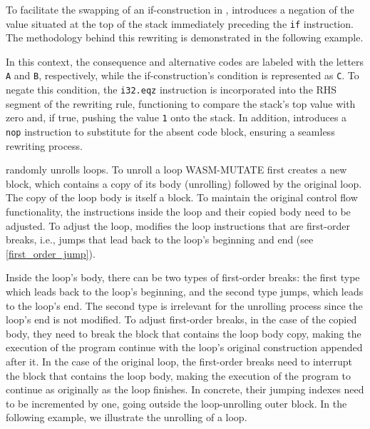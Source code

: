To facilitate the swapping of an if-construction in \Wasm, \tool introduces a negation of the value situated at the top of the stack immediately preceding the \texttt{if} instruction. 
The methodology behind this rewriting is demonstrated in the following example.




In this context, the consequence and alternative codes are labeled with the letters \texttt{A} and \texttt{B}, respectively, while the if-construction's condition is represented as \texttt{C}. 
To negate this condition, the \texttt{i32.eqz} instruction is incorporated into the RHS segment of the rewriting rule, functioning to compare the stack's top value with zero and, if true, pushing the value \texttt{1} onto the stack.
In addition, \tool introduces a \texttt{nop} instruction to substitute for the absent code block, ensuring a seamless rewriting process.


 \tool randomly unrolls loops.
To unroll a loop WASM-MUTATE first creates a new \wasm block, which contains a copy of its body (unrolling) followed by the original loop.
The copy of the loop body is itself a \wasm block.
To maintain the original control flow functionality, the instructions inside the loop and their copied body need to be adjusted.
To adjust the loop, \tool modifies the loop instructions that are first-order breaks, i.e., jumps that lead back to the loop's beginning and end (see \autoref{first_order_jump}). 

Inside the loop's body, there can be two types of first-order breaks: the first type which leads back to the loop's beginning, and the second type jumps, which leads to the loop's end.
The second type is irrelevant for the unrolling process since the loop's end is not modified.
To adjust first-order breaks, in the case of the copied body, they need to break the \wasm block that contains the loop body copy, making the execution of the program continue with the loop's original construction appended after it.
In the case of the original loop, the first-order breaks need to interrupt the block that contains the loop body, making the execution of the program to continue as originally as the loop finishes.
In concrete, their jumping indexes need to be incremented by one, going outside the loop-unrolling outer \wasm block.
In the following example, we illustrate the unrolling of a loop.



